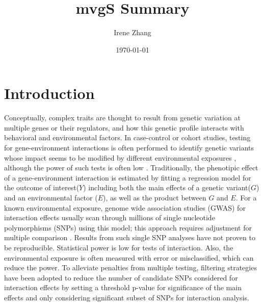 \documentclass{article}
\title{mvgS Summary}
\author{Irene Zhang}
\date{\today}
\begin{document}
	\maketitle

	
\section{Introduction}
	Conceptually, complex traits are thought to result from genetic variation at multiple genes or their regulators, and how this genetic profile interacts with behavioral and environmental factors. In case-control or cohort studies, testing for gene-environment interactions is often performed  to identify genetic variants whose impact seems to be modified by different environmental exposures \cite{thomas2010gene}, although the power of such tests is often low \cite{cordell2009detecting}. Traditionally, the phenotipic effect of a gene-environment interaction is estimated by fitting a regression model for the outcome of interest($Y$) including both the main effects of a genetic variant($G$) and an environmental factor ($E$), as well as the product between $G$ and $E$. For a known environmental exposure, genome wide association studies (GWAS) for interaction effects usually scan through millions of single nucleotide polymorphisms (SNPs) using this model; this approach requires adjustment for multiple comparison \cite{he2017set}. Results from such single SNP analyses have  not proven to be reproducible. Statistical power is low for tests of interaction. Also, the environmental exposure is often measured with error or misclassified, which can reduce the power\cite{thomas2010gene, tchetgen2011robustness, cornelis2012gene, boonstra2016tests}. To alleviate penalties from multiple testing, filtering strategies have been adopted to reduce the number of candidate SNPs considered for interaction effects \cite{kooperberg2008increasing, thomas2010gene} by setting a threshold p-value for significance of the main effects and only considering significant subset of SNPs for interaction analysis.
	 
\end{document}
